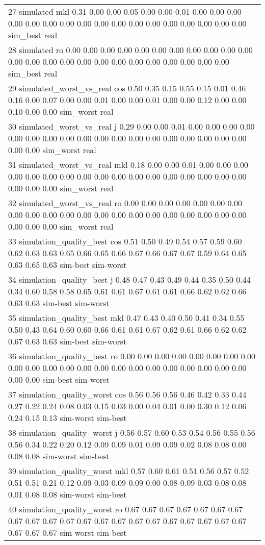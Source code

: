 \begin{table}[!tbp]
\begin{center}
\begin{tabular}{l}
27                simulated mkl 0.31 0.00 0.00 0.05 0.00 0.00 0.01 0.00 0.00 0.00 0.00 0.00 0.00 0.00 0.00 0.00 0.00 0.00 0.00 0.00 0.00 0.00 0.00 0.00  sim\_best      real\tabularnewline
28                simulated  ro 0.00 0.00 0.00 0.00 0.00 0.00 0.00 0.00 0.00 0.00 0.00 0.00 0.00 0.00 0.00 0.00 0.00 0.00 0.00 0.00 0.00 0.00 0.00 0.00  sim\_best      real\tabularnewline
29  simulated\_worst\_vs\_real cos 0.50 0.35 0.15 0.55 0.15 0.01 0.46 0.16 0.00 0.07 0.00 0.00 0.01 0.00 0.00 0.01 0.00 0.00 0.12 0.00 0.00 0.10 0.00 0.00 sim\_worst      real\tabularnewline
30  simulated\_worst\_vs\_real   j 0.29 0.00 0.00 0.01 0.00 0.00 0.00 0.00 0.00 0.00 0.00 0.00 0.00 0.00 0.00 0.00 0.00 0.00 0.00 0.00 0.00 0.00 0.00 0.00 sim\_worst      real\tabularnewline
31  simulated\_worst\_vs\_real mkl 0.18 0.00 0.00 0.01 0.00 0.00 0.00 0.00 0.00 0.00 0.00 0.00 0.00 0.00 0.00 0.00 0.00 0.00 0.00 0.00 0.00 0.00 0.00 0.00 sim\_worst      real\tabularnewline
32  simulated\_worst\_vs\_real  ro 0.00 0.00 0.00 0.00 0.00 0.00 0.00 0.00 0.00 0.00 0.00 0.00 0.00 0.00 0.00 0.00 0.00 0.00 0.00 0.00 0.00 0.00 0.00 0.00 sim\_worst      real\tabularnewline
33  simulation\_quality\_best cos 0.51 0.50 0.49 0.54 0.57 0.59 0.60 0.62 0.63 0.63 0.65 0.66 0.65 0.66 0.67 0.66 0.67 0.67 0.59 0.64 0.65 0.63 0.65 0.63  sim-best sim-worst\tabularnewline
34  simulation\_quality\_best   j 0.48 0.47 0.43 0.49 0.44 0.35 0.50 0.44 0.34 0.60 0.58 0.58 0.65 0.61 0.61 0.67 0.61 0.61 0.66 0.62 0.62 0.66 0.63 0.63  sim-best sim-worst\tabularnewline
35  simulation\_quality\_best mkl 0.47 0.43 0.40 0.50 0.41 0.34 0.55 0.50 0.43 0.64 0.60 0.60 0.66 0.61 0.61 0.67 0.62 0.61 0.66 0.62 0.62 0.67 0.63 0.63  sim-best sim-worst\tabularnewline
36  simulation\_quality\_best  ro 0.00 0.00 0.00 0.00 0.00 0.00 0.00 0.00 0.00 0.00 0.00 0.00 0.00 0.00 0.00 0.00 0.00 0.00 0.00 0.00 0.00 0.00 0.00 0.00  sim-best sim-worst\tabularnewline
37 simulation\_quality\_worst cos 0.56 0.56 0.56 0.46 0.42 0.33 0.44 0.27 0.22 0.24 0.08 0.03 0.15 0.03 0.00 0.04 0.01 0.00 0.30 0.12 0.06 0.24 0.15 0.13 sim-worst  sim-best\tabularnewline
38 simulation\_quality\_worst   j 0.56 0.57 0.60 0.53 0.54 0.56 0.55 0.56 0.56 0.34 0.22 0.20 0.12 0.09 0.09 0.01 0.09 0.09 0.02 0.08 0.08 0.00 0.08 0.08 sim-worst  sim-best\tabularnewline
39 simulation\_quality\_worst mkl 0.57 0.60 0.61 0.51 0.56 0.57 0.52 0.51 0.51 0.21 0.12 0.09 0.03 0.09 0.09 0.00 0.08 0.09 0.03 0.08 0.08 0.01 0.08 0.08 sim-worst  sim-best\tabularnewline
40 simulation\_quality\_worst  ro 0.67 0.67 0.67 0.67 0.67 0.67 0.67 0.67 0.67 0.67 0.67 0.67 0.67 0.67 0.67 0.67 0.67 0.67 0.67 0.67 0.67 0.67 0.67 0.67 sim-worst  sim-best\tabularnewline

\end{tabular}
\end{center}
\end{table}
